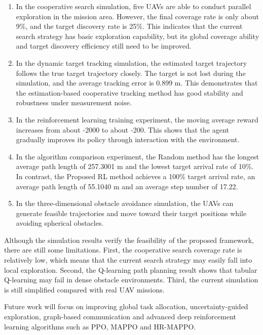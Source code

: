 \documentclass[14pt,a4paper]{extarticle}
\begin{document}
\begin{enumerate}[label=\arabic*)]
  \item In the cooperative search simulation, five UAVs are able to conduct parallel exploration in the mission area. However, the final coverage rate is only about 9\%, and the target discovery rate is 25\%. This indicates that the current search strategy has basic exploration capability, but its global coverage ability and target discovery efficiency still need to be improved.

  \item In the dynamic target tracking simulation, the estimated target trajectory follows the true target trajectory closely. The target is not lost during the simulation, and the average tracking error is 0.899 m. This demonstrates that the estimation-based cooperative tracking method has good stability and robustness under measurement noise.

  \item In the reinforcement learning training experiment, the moving average reward increases from about -2000 to about -200. This shows that the agent gradually improves its policy through interaction with the environment.

  \item In the algorithm comparison experiment, the Random method has the longest average path length of 257.3001 m and the lowest target arrival rate of 10\%. In contrast, the Proposed RL method achieves a 100\% target arrival rate, an average path length of 55.1040 m and an average step number of 17.22.

  \item In the three-dimensional obstacle avoidance simulation, the UAVs can generate feasible trajectories and move toward their target positions while avoiding spherical obstacles.
\end{enumerate}

Although the simulation results verify the feasibility of the proposed framework, there are still some limitations. First, the cooperative search coverage rate is relatively low, which means that the current search strategy may easily fall into local exploration. Second, the Q-learning path planning result shows that tabular Q-learning may fail in dense obstacle environments. Third, the current simulation is still simplified compared with real UAV missions.

Future work will focus on improving global task allocation, uncertainty-guided exploration, graph-based communication and advanced deep reinforcement learning algorithms such as PPO, MAPPO and HR-MAPPO.
\end{document}
